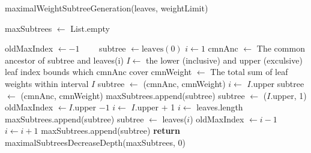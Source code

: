 \documentclass{report}
\begin{document}
\begin{algorithm}[H]
\caption{maximalWeightSubtreeGeneration(leaves, weightLimit)}
\label{maximalWeightSubtreeGeneration}


maxSubtrees $\leftarrow $ List.empty\;

oldMaxIndex $\leftarrow -1$\ \ \ \  
subtree $\leftarrow \text{leaves}(0)$\;
$i \leftarrow 1$\;
{
	cmnAnc $\leftarrow$ The common ancestor of subtree and leaves(i)\;
	$I \leftarrow$ the lower (inclusive) and upper (exculsive) leaf index bounds which cmnAnc cover\;
	cmnWeight $\leftarrow$ The total sum of leaf weights within interval $I$\;
	{
		subtree $\leftarrow$ (cmnAnc, cmnWeight)\;
		$i \leftarrow$ $I$.upper\;
	}
	{
		subtree $\leftarrow$ (cmnAnc, cmnWeight)\;
		{
			maxSubtrees.append(subtree)\;
			subtree $\leftarrow$ ($I$.upper, 1)\;
			oldMaxIndex $\leftarrow I$.upper $-1$\;
			$i \leftarrow$ $I$.upper + 1\;
		}
		\Else
		{
			$i \leftarrow$ leaves.length\;
		}
	}
	\Else
	{
		maxSubtrees.append(subtree)\;
		subtree $\leftarrow$ leaves($i$)\;
		oldMaxIndex $\leftarrow i-1$\;
		$i \leftarrow i + 1$\;
	}
}
maxSubtrees.append(subtree)\;
\textbf{return} maximalSubtreesDecreaseDepth(maxSubtrees, 0)\;
\end{algorithm}
\end{document}
